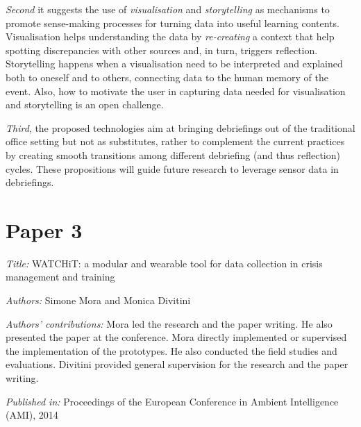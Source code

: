 \emph{Second} it suggests the use of \emph{visualisation} and \emph{storytelling} as mechanisms to promote sense-making processes for turning data into useful learning contents. Visualisation helps understanding the data by \emph{re-creating} a context that help spotting discrepancies with other sources and, in turn, triggers reflection. Storytelling happens when a visualisation need to be interpreted and explained both to oneself and to others, connecting data to the human memory of the event. Also, how to motivate the user in capturing data needed for visualisation and storytelling is an open challenge.

\emph{Third}, the proposed technologies aim at bringing debriefings out of the traditional office setting but not as substitutes, rather to complement the current practices by creating smooth transitions among different debriefing (and thus reflection) cycles. These propositions will guide future research to leverage sensor data in debriefings.


\section[P3: WATCHiT: a modular and wearable tool for data collection in crisis management and training][Paper 3]{Paper 3}\label{paper-3}

\emph{Title:} WATCHiT: a modular and wearable tool for data collection in crisis management and training

\emph{Authors:} Simone Mora and Monica Divitini

\emph{Authors' contributions:} Mora led the research and the paper writing. He also presented the paper at the conference. Mora directly implemented or supervised the implementation of the prototypes. He also conducted the field studies and evaluations. Divitini provided general supervision for the research and the paper writing.

\emph{Published in:} Proceedings of the European Conference in Ambient Intelligence (AMI), 2014 

